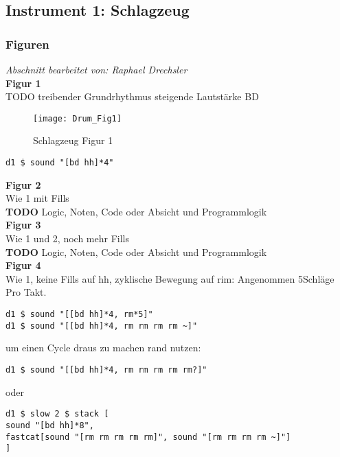 \documentclass[
10pt, %
a4paper, %
oneside, %
headinclude,footinclude, %
BCOR5mm, %
]{scrartcl}
\begin{document}
\subsection{Instrument 1: Schlagzeug}
\subsubsection{Figuren}
\textit{Abschnitt bearbeitet von: Raphael Drechsler}\\

\noindent \textbf{Figur 1}\\
TODO
treibender Grundrhythmus steigende Lautstärke BD
\begin{figure}[h]
	\centering 
	\texttt{[image: Drum\_Fig1]} 
	\caption{Schlagzeug Figur 1}
\end{figure}

\begin{lstlisting}
d1 $ sound "[bd hh]*4"
\end{lstlisting}

\noindent \textbf{Figur 2}\\
Wie 1 mit Fills\\
{\color{red}\textbf{TODO}} Logic, Noten, Code oder Absicht und Programmlogik\\

\noindent \textbf{Figur 3}\\
Wie 1 und 2, noch mehr Fills\\
{\color{red}\textbf{TODO}} Logic, Noten, Code oder Absicht und Programmlogik\\

\noindent \textbf{Figur 4}\\
Wie 1, keine Fills auf hh,
zyklische Bewegung auf rim: Angenommen 5Schläge Pro Takt.

\begin{lstlisting}
d1 $ sound "[[bd hh]*4, rm*5]"
d1 $ sound "[[bd hh]*4, rm rm rm rm ~]"
\end{lstlisting}

um einen Cycle draus zu machen rand nutzen:

\begin{lstlisting}
d1 $ sound "[[bd hh]*4, rm rm rm rm rm?]"
\end{lstlisting}

oder

\begin{lstlisting}
d1 $ slow 2 $ stack [
sound "[bd hh]*8",
fastcat[sound "[rm rm rm rm rm]", sound "[rm rm rm rm ~]"]
]
\end{lstlisting}
\end{document}
